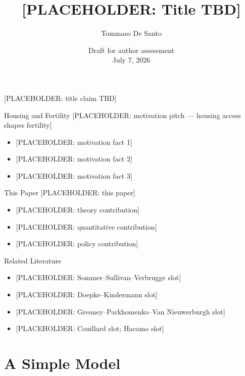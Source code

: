\documentclass[aspectratio=169,10pt]{beamer}
\title{[PLACEHOLDER: Title TBD]}
\author{Tommaso De Santo}
\date{Draft for author assessment\\July 7, 2026}
\providecommand{\1}{\mathbf 1}
\begin{document}
\begin{frame}{[PLACEHOLDER: title claim TBD]}
  \titlepage
\end{frame}

\begin{frame}{Housing and Fertility}
  \alert{[PLACEHOLDER: motivation pitch --- housing access shapes fertility]}
  \begin{itemize}
    \item {[}PLACEHOLDER: motivation fact 1]
    \item {[}PLACEHOLDER: motivation fact 2]
    \item {[}PLACEHOLDER: motivation fact 3]
  \end{itemize}
\end{frame}

\begin{frame}{This Paper}
  \alert{[PLACEHOLDER: this paper]}
  \begin{itemize}
    \item {[}PLACEHOLDER: theory contribution]
    \item {[}PLACEHOLDER: quantitative contribution]
    \item {[}PLACEHOLDER: policy contribution]
  \end{itemize}
\end{frame}

\begin{frame}{Related Literature}
  \begin{itemize}
    \item {[}PLACEHOLDER: Sommer--Sullivan--Verbrugge slot]
    \item {[}PLACEHOLDER: Doepke--Kindermann slot]
    \item {[}PLACEHOLDER: Greaney--Parkhomenko--Van Nieuwerburgh slot]
    \item {[}PLACEHOLDER: Couillard slot; Hacamo slot]
  \end{itemize}
\end{frame}

\section{A Simple Model}
\end{document}
